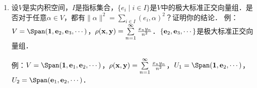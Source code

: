 \begin{enumerate}
\item 设$V$是实内积空间，$I$是指标集合，$\{e_i\mid i\in I\}$是$V$中的极大标准正交向量组．是否对于任意$\alpha\in V$，都有$\|\alpha\|^2=\sum\limits_{i\in I}(e_i,\alpha)^2$？证明你的结论．
例：$V=\Span({\bf 1},{\bf e}_2,{\bf e}_3,\cdots)$，$\rho({\bf x,y})=\sum\limits_{n=1}^\infty\frac{x_ny_n}{n^2}$．$\{{\bf e}_2,{\bf e}_3,\cdots\}$是极大标准正交向量组．

例：$V=\Span({\bf 1},{\bf e}_1,{\bf e}_2,\cdots)$，$\rho({\bf x,y})=\sum\limits_{n=1}^\infty\frac{x_ny_n}{n^2}$，$U_1=\Span({\bf 1},{\bf e}_2,\cdots)$，$U_2=\Span({\bf e}_1,{\bf e}_2,\cdots)$．
\end{enumerate}

